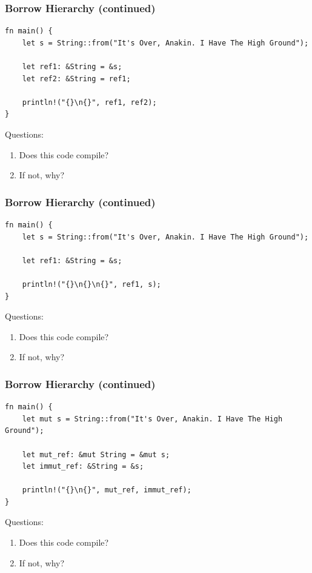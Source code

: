 \documentclass{slides}
\begin{document}
\begin{frame}[fragile]
\frametitle{Borrow Hierarchy (continued)}
\begin{verbatim}
fn main() {
    let s = String::from("It's Over, Anakin. I Have The High Ground");

    let ref1: &String = &s;
    let ref2: &String = ref1;

    println!("{}\n{}", ref1, ref2);
}
\end{verbatim}
Questions:
\begin{enumerate}
    \item Does this code compile?
    \item If not, why?
\end{enumerate}
\end{frame}

\begin{frame}[fragile]
\frametitle{Borrow Hierarchy (continued)}
\begin{verbatim}
fn main() {
    let s = String::from("It's Over, Anakin. I Have The High Ground");

    let ref1: &String = &s;

    println!("{}\n{}\n{}", ref1, s);
}
\end{verbatim}
Questions:
\begin{enumerate}
    \item Does this code compile?
    \item If not, why?
\end{enumerate}
\end{frame}

\begin{frame}[fragile]
\frametitle{Borrow Hierarchy (continued)}
\begin{verbatim}
fn main() {
    let mut s = String::from("It's Over, Anakin. I Have The High Ground");

    let mut_ref: &mut String = &mut s;
    let immut_ref: &String = &s;
    
    println!("{}\n{}", mut_ref, immut_ref);
}
\end{verbatim}
Questions:
\begin{enumerate}
    \item Does this code compile?
    \item If not, why?
\end{enumerate}
\end{frame}
\end{document}
